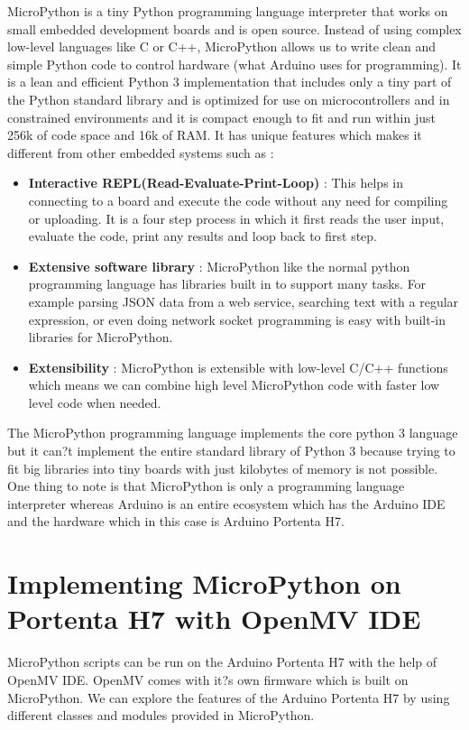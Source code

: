 MicroPython is a tiny Python programming language interpreter that works on small embedded development boards and is open source. Instead of using complex  low-level languages like C or C++, MicroPython allows us  to write clean and simple  Python code to control hardware (what Arduino uses for programming). It is a lean and efficient Python 3 implementation that includes only a tiny part of the Python standard library and is optimized for use on microcontrollers and in constrained environments and it is compact enough to fit and run within just 256k of code space and 16k of RAM.\cite{Romero:2020a}
It has unique features which makes it different from other embedded systems such as :
\begin{itemize}
	\item \textbf{Interactive REPL(Read-Evaluate-Print-Loop)} :  This helps in connecting to a board and execute the code without any need for compiling or uploading. It is a four step process in which it first reads the user input, evaluate the code, print any results and loop back to first step.
	\item \textbf{Extensive software library} : MicroPython like the normal python programming language has libraries built in to support many tasks. For example parsing JSON data from a web service, searching text with a regular expression, or even doing network socket programming is easy with built-in libraries for MicroPython.
	\item \textbf{Extensibility} : MicroPython is extensible with low-level C/C++ functions which means we can combine high level MicroPython code with faster low level code when needed.
\end{itemize}
The MicroPython programming language implements the core python 3 language but it can?t implement the entire standard library of Python 3 because trying to fit big libraries into tiny boards with just kilobytes of memory is not possible. One thing to note is that MicroPython is only a programming language interpreter whereas Arduino is an entire ecosystem which has the Arduino IDE and the hardware which in this case is Arduino Portenta H7.

\section{Implementing MicroPython on Portenta H7 with OpenMV IDE}
MicroPython scripts can be run on the Arduino Portenta H7 with the help of OpenMV IDE\cite{Romero:2020}. OpenMV comes with it?s own firmware which is built on MicroPython. We can explore the features of the Arduino Portenta H7 by using different classes and modules provided in MicroPython.

